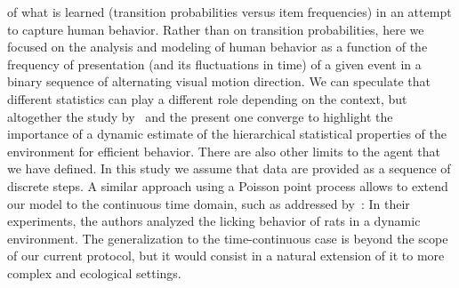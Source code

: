 \documentclass[12pt,english]{article}%
\newcommand{\citet}[1]{\textcite{#1}}
\begin{document}
of what is learned (transition probabilities versus item frequencies)
in an attempt to capture human behavior. Rather than on transition probabilities, here we focused on the analysis and modeling of human behavior as a function of the frequency of presentation (and its fluctuations in time) of a given event in a binary sequence of alternating visual motion direction. We can speculate that different statistics can play a different role depending on the context, but altogether the study by~\citet{Meyniel16} and the present one converge to highlight the importance of a dynamic estimate of the hierarchical statistical properties of the environment for efficient behavior.
There are also other limits to the agent that we have defined. In this study we assume that data are provided as a sequence of discrete steps.
A similar approach using a Poisson point process
allows to extend our model to the continuous time domain, such as addressed by~\citet{RadilloBrady2017}:
In their experiments, the authors analyzed the licking behavior of rats in a dynamic environment.
The generalization to the time-continuous case is beyond the scope of our current protocol,
but it would consist in a natural extension of it
to more complex and ecological settings.
\end{document}
